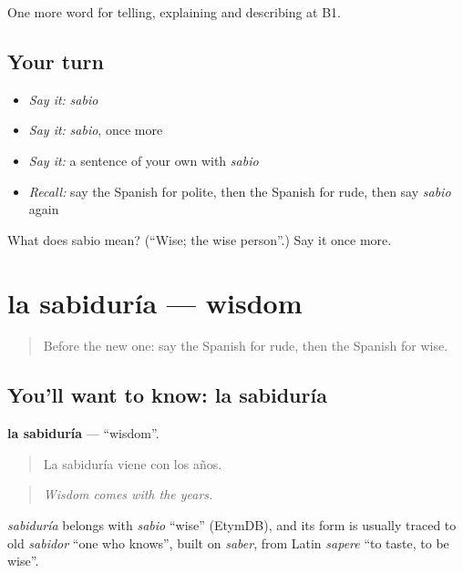 \begin{grammarlens}[title={What you've built}]
One more word for telling, explaining and describing at B1.
\end{grammarlens}

\subsection*{Your turn}
\begin{itemize}
\raggedright
  \item \emph{Say it:} \emph{sabio}
  \item \emph{Say it:} \emph{sabio}, once more
  \item \emph{Say it:} a sentence of your own with \emph{sabio}
  \item \emph{Recall:} say the Spanish for polite, then the Spanish for rude, then say \emph{sabio} again
\end{itemize}

\begin{tcolorbox}[breakable,colback=teal!4,colframe=teal!35!black,title={Before you move on}]
What does sabio mean? (\textquotedblleft{}Wise; the wise person\textquotedblright{}.) Say it once more.
\end{tcolorbox}
\section[la sabiduría]{la sabiduría — wisdom}

\label{lesson:ES-C728-sabiduria}



\begin{quote}
Before the new one: say the Spanish for rude, then the Spanish for wise.
\end{quote}

\subsection*{You'll want to know: la sabiduría}
\textbf{la sabiduría} — \textquotedblleft{}wisdom\textquotedblright{}.

\begin{quote}
La sabiduría viene con los años.
\end{quote}

\begin{quote}
\emph{Wisdom comes with the years.}
\end{quote}

\begin{cousinweb}
\emph{sabiduría} belongs with \emph{sabio} \textquotedblleft{}wise\textquotedblright{} (EtymDB), and its form is usually traced to old \emph{sabidor} \textquotedblleft{}one who knows\textquotedblright{}, built on \emph{saber}, from Latin \emph{sapere} \textquotedblleft{}to taste, to be wise\textquotedblright{}.
\end{cousinweb}

